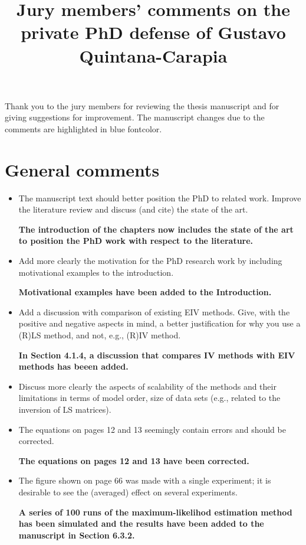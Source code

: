 \documentclass[11pt]{article}
\date{\vspace{-10ex}}
\begin{document}
\title{Jury members' comments on the private PhD defense of \linebreak Gustavo Quintana-Carapia} 

\maketitle

Thank you to the jury members for reviewing the thesis manuscript and for giving suggestions for improvement. 
The manuscript changes due to the comments are highlighted in \color{blue} blue fontcolor\color{black}.

\section*{General comments}

\begin{itemize}
	\item The manuscript text should better position the PhD to related work. Improve the literature review and discuss (and cite) the state of the art.
	
	{\bfseries The introduction of the chapters now includes the state of the art to position the PhD work with respect to the literature.}
	
	\item  Add more clearly the motivation for the PhD research work by including motivational examples to the introduction.
	
	{\bfseries Motivational examples have been added to the Introduction. }
	
	\item  Add a discussion with comparison of existing EIV methods. Give, with the positive and negative aspects in mind, a better justification for why you use a (R)LS method, and not, e.g., (R)IV method.
	
	{\bfseries In Section 4.1.4, a discussion that compares IV methods with EIV methods has beeen added.}

	\item  Discuss more clearly the aspects of scalability of the methods and their limitations in terms of model order, size of data sets (e.g., related to the inversion of LS matrices).
	\item  The equations on pages 12 and 13 seemingly contain errors and should be corrected.
	
	{\bfseries The equations on pages 12 and 13 have been corrected.}
	
	\item  The figure shown on page 66 was made with a single experiment; it is desirable to see the (averaged) effect on several experiments.
	
	{\bfseries A series of 100 runs of the maximum-likelihod estimation method has been simulated and the results have been added to the manuscript in Section 6.3.2.}
	
\end{itemize}
\end{document}
